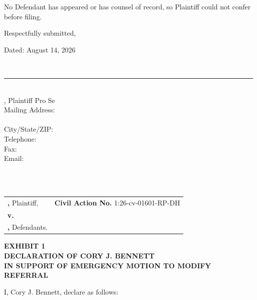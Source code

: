 \documentclass[12pt]{article}
\makeatletter
\renewcommand{\FilingCivilActionNumber}{1:26-cv-01601-RP-DH}
\renewcommand{\FilingDate}{August 14, 2026}
\newcommand{\Caption}{%
  \begin{singlespace}
  \begin{center}
  \textbf{\FilingCourtName}\\
  \textbf{\FilingDistrictName}\\
  \textbf{\FilingDivisionName}
  \end{center}

  \vspace{0.45em}

  \noindent
  \begin{tabularx}{\textwidth}{@{}>{\raggedright\arraybackslash}X>{\raggedright\arraybackslash}p{2.95in}@{}}
  \textbf{\FilingPlaintiffNameUpper,} Plaintiff, & \textbf{Civil Action No.} \FilingCivilActionNumber \\
  \textbf{v.} & \\
  \textbf{\FilingDefendantsInlineUpper,} Defendants. & \\
  \end{tabularx}

  \vspace{1.0em}
  \end{singlespace}%
}
\makeatother
\begin{document}
No Defendant has appeared or has counsel of record, so Plaintiff could not confer before filing.

\singlespacing
\vspace{-0.3em}
\noindent Respectfully submitted,

\vspace{0em}
\noindent Dated: \FilingDate

\vspace{0em}
\noindent\makebox[3.2in][l]{\SignatureFourOnLine[width=1.5in]}\\[-0.55em]
\rule{3.2in}{0.4pt}\\
\FilingPlaintiffName, Plaintiff Pro Se\\
Mailing Address: \FilingPlaintiffMailingLineOne\\
\phantom{Mailing Address: }\FilingPlaintiffMailingLineTwo\\
City/State/ZIP: \FilingPlaintiffMailingCityStateZip\\
Telephone: \FilingPlaintiffTelephone\\
Fax: \FilingPlaintiffFax\\
Email: \FilingPlaintiffEmail

\clearpage
\singlespacing
\Caption

\hypertarget{referral-exhibit.1}{}%
\label{referral-exhibit.1.start}%
%

\begin{singlespace}
\begin{center}
\textbf{EXHIBIT 1}\\[0.35em]
\textbf{DECLARATION OF CORY J. BENNETT}\\
\textbf{IN SUPPORT OF EMERGENCY MOTION TO MODIFY REFERRAL}
\end{center}
\end{singlespace}

I, Cory J. Bennett, declare as follows:
\end{document}
